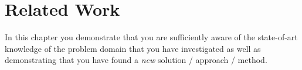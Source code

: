 \chapter{Related Work}\label{relatedwork}
In this chapter you demonstrate that you are sufficiently aware of the
state-of-art knowledge of the problem domain that you have investigated as
well as demonstrating that you have found a \emph{new} solution / approach / method.
